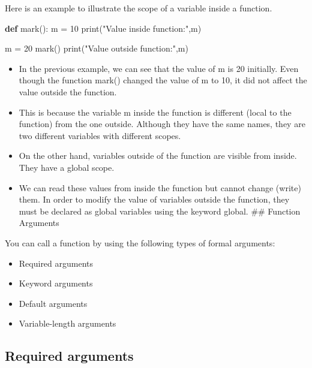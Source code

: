 \documentclass[11pt]{article}
\providecommand{\tightlist}{%
      \setlength{\itemsep}{0pt}\setlength{\parskip}{0pt}}
\newenvironment{Shaded}{}{}
\newcommand{\KeywordTok}[1]{\textcolor[rgb]{0.00,0.44,0.13}{\textbf{{#1}}}}
\newcommand{\DecValTok}[1]{\textcolor[rgb]{0.25,0.63,0.44}{{#1}}}
\newcommand{\StringTok}[1]{\textcolor[rgb]{0.25,0.44,0.63}{{#1}}}
\newcommand{\NormalTok}[1]{{#1}}
\newcommand{\OperatorTok}[1]{\textcolor[rgb]{0.40,0.40,0.40}{{#1}}}
\newcommand{\BuiltInTok}[1]{{#1}}
\begin{document}
Here is an example to illustrate the scope of a variable inside a
function.

\begin{Shaded}
\begin{Highlighting}[]
\KeywordTok{def}\NormalTok{ mark():}
\NormalTok{    m }\OperatorTok{=} \DecValTok{10}
    \BuiltInTok{print}\NormalTok{(}\StringTok{"Value inside function:"}\NormalTok{,m)}

\NormalTok{m }\OperatorTok{=} \DecValTok{20}
\NormalTok{mark()}
\BuiltInTok{print}\NormalTok{(}\StringTok{"Value outside function:"}\NormalTok{,m)}
\end{Highlighting}
\end{Shaded}

\begin{itemize}
\item
  In the previous example, we can see that the value of m is 20
  initially. Even though the function mark() changed the value of m to
  10, it did not affect the value outside the function.
\item
  This is because the variable m inside the function is different (local
  to the function) from the one outside. Although they have the same
  names, they are two different variables with different scopes.
\item
  On the other hand, variables outside of the function are visible from
  inside. They have a global scope.
\item
  We can read these values from inside the function but cannot change
  (write) them. In order to modify the value of variables outside the
  function, they must be declared as global variables using the keyword
  global. \#\# Function Arguments
\end{itemize}

You can call a function by using the following types of formal
arguments:

\begin{itemize}
\tightlist
\item
  Required arguments
\item
  Keyword arguments
\item
  Default arguments
\item
  Variable-length arguments
\end{itemize}

\hypertarget{required-arguments}{%
\subsection{Required arguments}\label{required-arguments}}
\end{document}
